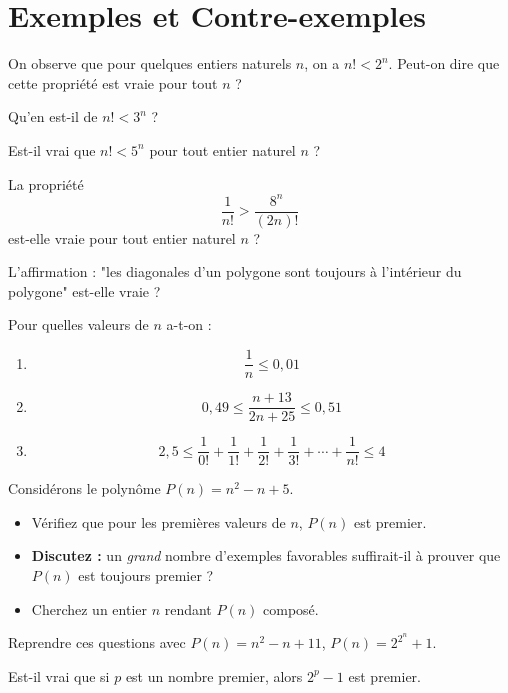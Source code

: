 \chapter{Exemples et Contre-exemples}

\begin{exercise}
  On observe que pour quelques entiers naturels $n$, on a $n! < 2^n$.
  Peut-on dire que cette propriété est vraie pour tout $n$ ?

  Qu'en est-il de $n! < 3^n$ ?

  Est-il vrai que $n! < 5^n$ pour tout entier naturel $n$ ?
\end{exercise}

\begin{exercise}
  La propriété
  \[
   \dfrac{1}{n!} > \dfrac{8^n}{(2n)!}
  \]
  est-elle vraie pour tout entier naturel $n$ ?
\end{exercise}

%

\begin{exercise}
 L'affirmation : "les diagonales d'un polygone sont toujours à l'intérieur du polygone" est-elle vraie ?
\end{exercise}

\begin{exercise}
 Pour quelles valeurs de $n$ a-t-on :
 \begin{enumerate}
  \item \[ \dfrac{1}{n} \leq 0,01 \]
  \item \[ 0,49 \leq \dfrac{n + 13}{2n + 25} \leq 0,51 \]
  \item \[ 2,5 \leq \frac{1}{0!} + \frac{1}{1!} + \frac{1}{2!} + \frac{1}{3!} + \cdots + \frac{1}{n!}  \leq 4 \]
 \end{enumerate}
\end{exercise}

\begin{exercise}
    Considérons le polynôme $P(n) = n^2 - n + 5$.
    \begin{itemize}
      \item Vérifiez que pour les premières valeurs de $n$, $P(n)$ est premier.
      \item \textbf{Discutez :} un \emph{grand} nombre d’exemples favorables suffirait-il à prouver que $P(n)$ est toujours premier ?
      \item Cherchez un entier $n$ rendant $P(n)$ composé.
    \end{itemize}
    Reprendre ces questions avec $P(n) = n^2 - n + 11$, $P(n) = 2^{2^n}+1$.

    Est-il vrai que si $p$ est un nombre premier, alors $2^p - 1$ est premier.
\end{exercise}

